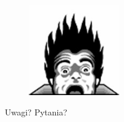 \documentclass{beamer}
\begin{document}

\begin{frame}
	\begin{figure}
		\centering
		\includegraphics[width=4cm]{img/coding_horror}
	\end{figure}
	\Huge{\centerline{Uwagi? Pytania?}}
\end{frame}

\end{document}

